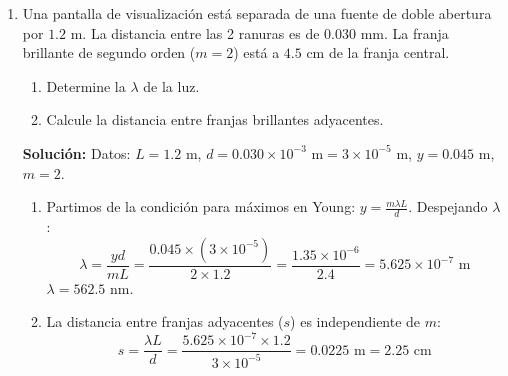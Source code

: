 \documentclass[12pt, letterpaper]{article}
\begin{document}
\begin{enumerate}
		1. \textbf{Diferencia de trayectoria ($\Delta r$):} Si $L \gg d$, los rayos paralelos forman un ángulo $\theta$ donde $\sin\theta \approx \tan\theta = \frac{y}{L}$.
		$$ \Delta r = d \sin\theta \approx d \frac{y}{L} $$
		
		2. \textbf{Diferencia de fase ($\Delta\varphi$):} Utilizando el número de onda $k = \frac{2\pi}{\lambda}$:
		$$ \Delta\varphi = k\Delta r = \frac{2\pi}{\lambda} \left( \frac{dy}{L} \right) $$
		
		3. \textbf{Intensidad ($I$):} Asumiendo fuentes iguales $I_1 = I_2 = I_0$:
		$$ I = 2I_0 [1 + \cos(\Delta\varphi)] = 4I_0 \cos^2\left(\frac{\Delta\varphi}{2}\right) $$
		$$ I = 4I_0 \cos^2\left( \frac{\pi d y}{\lambda L} \right) $$
		
		4. \textbf{Separación de franjas ($s$):} Los máximos ocurren cuando $\Delta\varphi = 2\pi m$.
		$$ \frac{2\pi d y_m}{\lambda L} = 2\pi m \implies y_m = \frac{m\lambda L}{d} $$
		La separación entre dos máximos adyacentes $s = y_{m+1} - y_m$ es:
		$$ s = \frac{\lambda L}{d} $$
		
		\item Una pantalla de visualización está separada de una fuente de doble abertura por $1.2\text{ m}$. La distancia entre las 2 ranuras es de $0.030\text{ mm}$. La franja brillante de segundo orden ($m=2$) está a $4.5\text{ cm}$ de la franja central.
		\begin{enumerate}
			\item Determine la $\lambda$ de la luz. 
			\item Calcule la distancia entre franjas brillantes adyacentes.
		\end{enumerate}
		
		\textbf{Solución:}
		Datos: $L = 1.2\text{ m}$, $d = 0.030 \times 10^{-3}\text{ m} = 3 \times 10^{-5}\text{ m}$, $y = 0.045\text{ m}$, $m = 2$.
		
		\begin{enumerate}
			\item Partimos de la condición para máximos en Young: $y = \frac{m\lambda L}{d}$.
			Despejando $\lambda$:
			$$ \lambda = \frac{y d}{m L} = \frac{0.045 \times (3 \times 10^{-5})}{2 \times 1.2} = \frac{1.35 \times 10^{-6}}{2.4} = 5.625 \times 10^{-7}\text{ m} $$
			$\lambda = 562.5\text{ nm}$.
			
			\item La distancia entre franjas adyacentes ($s$) es independiente de $m$:
			$$ s = \frac{\lambda L}{d} = \frac{5.625 \times 10^{-7} \times 1.2}{3 \times 10^{-5}} = 0.0225\text{ m} = 2.25\text{ cm} $$
		\end{enumerate}
		

\end{enumerate}
\end{document}
